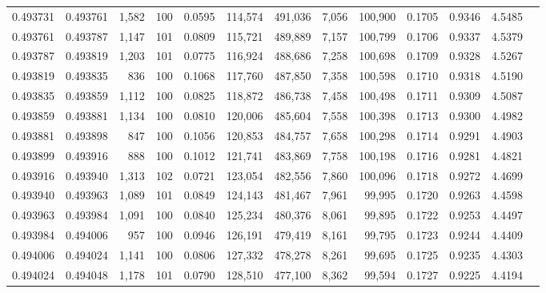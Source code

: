 \begin{tabular}{rrrrrrrrrrrrr}
0.493731 & 0.493761 & 1,582 & 100 &                                     0.0595 & 114,574 & 491,036 &   7,056 & 100,900 & 0.1705 & 0.9346 & 4.5485 \\
0.493761 & 0.493787 & 1,147 & 101 &                                     0.0809 & 115,721 & 489,889 &   7,157 & 100,799 & 0.1706 & 0.9337 & 4.5379 \\
0.493787 & 0.493819 & 1,203 & 101 &                                     0.0775 & 116,924 & 488,686 &   7,258 & 100,698 & 0.1709 & 0.9328 & 4.5267 \\
0.493819 & 0.493835 &   836 & 100 &                                     0.1068 & 117,760 & 487,850 &   7,358 & 100,598 & 0.1710 & 0.9318 & 4.5190 \\
0.493835 & 0.493859 & 1,112 & 100 &                                     0.0825 & 118,872 & 486,738 &   7,458 & 100,498 & 0.1711 & 0.9309 & 4.5087 \\
0.493859 & 0.493881 & 1,134 & 100 &                                     0.0810 & 120,006 & 485,604 &   7,558 & 100,398 & 0.1713 & 0.9300 & 4.4982 \\
0.493881 & 0.493898 &   847 & 100 &                                     0.1056 & 120,853 & 484,757 &   7,658 & 100,298 & 0.1714 & 0.9291 & 4.4903 \\
0.493899 & 0.493916 &   888 & 100 &                                     0.1012 & 121,741 & 483,869 &   7,758 & 100,198 & 0.1716 & 0.9281 & 4.4821 \\
0.493916 & 0.493940 & 1,313 & 102 &                                     0.0721 & 123,054 & 482,556 &   7,860 & 100,096 & 0.1718 & 0.9272 & 4.4699 \\
0.493940 & 0.493963 & 1,089 & 101 &                                     0.0849 & 124,143 & 481,467 &   7,961 &  99,995 & 0.1720 & 0.9263 & 4.4598 \\
0.493963 & 0.493984 & 1,091 & 100 &                                     0.0840 & 125,234 & 480,376 &   8,061 &  99,895 & 0.1722 & 0.9253 & 4.4497 \\
0.493984 & 0.494006 &   957 & 100 &                                     0.0946 & 126,191 & 479,419 &   8,161 &  99,795 & 0.1723 & 0.9244 & 4.4409 \\
0.494006 & 0.494024 & 1,141 & 100 &                                     0.0806 & 127,332 & 478,278 &   8,261 &  99,695 & 0.1725 & 0.9235 & 4.4303 \\
0.494024 & 0.494048 & 1,178 & 101 &                                     0.0790 & 128,510 & 477,100 &   8,362 &  99,594 & 0.1727 & 0.9225 & 4.4194 \\

\end{tabular}
